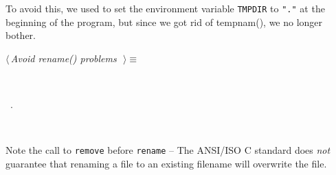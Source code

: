 \documentclass{report}
\begin{document}
To avoid this, we used to set the environment variable \verb|TMPDIR| 
to \verb|"."| at the beginning of the program, but since we got rid of
tempnam(), we no longer bother.

\begin{flushleft} \small
\begin{minipage}{\linewidth} \label{scrap130}
$\langle\,${\it Avoid rename() problems}\nobreak\ {\footnotesize {}}$\,\rangle\equiv$
\vspace{-1ex}
\begin{list}{}{} \item
\mbox{}\verb@@\\
\mbox{}\verb@@{\NWsep}
\end{list}
\vspace{-1ex}
\footnotesize\addtolength{\baselineskip}{-1ex}
\begin{list}{}{\setlength{\itemsep}{-\parsep}\setlength{\itemindent}{-\leftmargin}}
\item \NWtxtMacroRefIn\ .
\end{list}
\end{minipage}\\[4ex]
\end{flushleft}
Note the call to \verb|remove| before \verb|rename| --
The ANSI/ISO C standard does {\em not}
guarantee that renaming a file to an existing filename 
will overwrite the file. 
\end{document}
